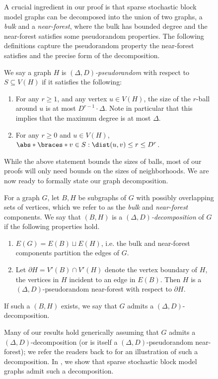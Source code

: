 \documentclass[11pt,letterpaper]{article}
\begin{document}
\begin{figure}
    A crucial ingredient in our proof is that sparse stochastic block model graphs can be decomposed into the union of two graphs, a \emph{bulk} and a \emph{near-forest}, where the bulk has bounded degree and the near-forest satisfies some pseudorandom properties.
    The following definitions capture the pseudorandom property the near-forest satisfies and the precise form of the decomposition.
    \begin{definition}\label{def:pseudorandom-graph}
        We say a graph $H$ is \emph{$(\Delta,D)$-pseudorandom} with respect to $S \subseteq V(H)$ if it satisfies the following:
        \begin{enumerate}
            \item For any $r\ge 1$, and any vertex $u\in V(H)$, the size of the $r$-ball around $u$ is at most $D^{r-1}\cdot\Delta$. Note in particular that this implies that the maximum degree is at most $\Delta$.
            \item For any $r\ge 0$ and $u\in V(H)$, $\abs*{\braces*{v\in S: \dist(u,v)\le r}} \le D^r$. 
        \end{enumerate}
    \end{definition}
    While the above statement bounds the sizes of balls, most of our proofs will only need bounds on the sizes of neighborhoods. We are now ready to formally state our graph decomposition.
    \begin{definition}
        For a graph $G$, let $B, H$ be subgraphs of $G$ with possibly overlapping sets of vertices, which we refer to as the \emph{bulk} and \emph{near-forest} components.
        We say that $(B, H)$ is a \emph{$(\Delta, D)$-decomposition} of $G$ if the following properties hold.
        \begin{enumerate}
            \item $E(G) = E(B) \sqcup E(H)$, i.e. the bulk and near-forest components partition the edges of $G$. 
            \item Let $\partial H = V'(B) \cap V'(H)$ denote the vertex boundary of $H$, the vertices in $H$ incident to an edge in $E(B)$. Then $H$ is a $(\Delta, D)$-pseudorandom near-forest with respect to $\partial H$.
        \end{enumerate}

        If such a $(B, H)$ exists, we say that $G$ admits a $(\Delta, D)$-decomposition.
    \end{definition}
    
    Many of our results hold generically assuming that $G$ admits a $(\Delta, D)$-decomposition (or is itself a $(\Delta, D)$-pseudorandom near-forest);  we refer the readers back to  for an illustration of such a decomposition. In , we show that sparse stochastic block model graphs admit such a decomposition.


\end{figure}
\end{document}
